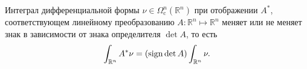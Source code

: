 
\begin{to_lem}
     Интеграл дифференциальной формы $\nu \in \Omega_{\text{c}}^n (\mathbb{R}^n)$ при отображении $A^*$, соответствующем линейному преобразованию $A : \mathbb{R}^n \mapsto  \mathbb{R}^n$ меняет или не меняет знак в зависимости от знака определителя $\det A$, то есть
     \begin{equation*}
         \int_{\mathbb{R}^n} A^* \nu = (\mathop{\mathrm{sign}}\nolimits \det A) \int_{\mathbb{R}^n} \nu.
     \end{equation*}
\end{to_lem}
